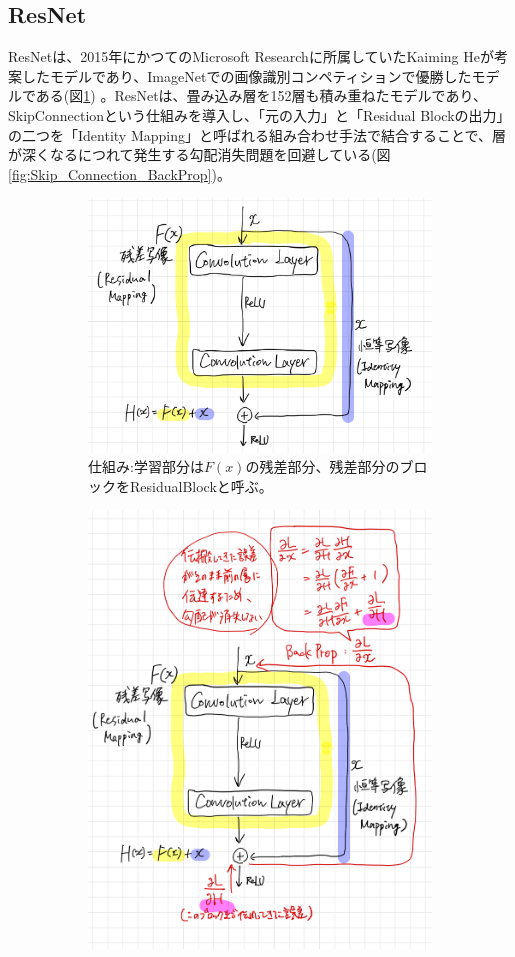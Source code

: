 \documentclass{ltjsarticle}
\begin{document}
\subsection{ResNet}
ResNetは、2015年にかつてのMicrosoft Researchに所属していたKaiming Heが考案したモデルであり、ImageNetでの画像識別コンペティションで優勝したモデルである(図\ref{fig:Skip_Connection}) 。ResNetは、畳み込み層を152層も積み重ねたモデルであり、SkipConnectionという仕組みを導入し、「元の入力」と「Residual Blockの出力」の二つを「Identity Mapping」と呼ばれる組み合わせ手法で結合することで、層が深くなるにつれて発生する勾配消失問題を回避している(図\ref{fig:Skip_Connection_BackProp})。

\begin{figure}[htbp]
  \centering
  \begin{subfigure}[b]{0.45\textwidth}
    \centering
    \includegraphics[width=0.8\linewidth]{./capture/Skip_Connection.png}
    \caption{仕組み:学習部分は$F(x)$の残差部分、残差部分のブロックをResidualBlockと呼ぶ。}
    \label{fig:Skip_Connection}
  \end{subfigure}
  \hfill
  \begin{subfigure}[b]{0.45\textwidth}
    \centering
    \includegraphics[width=0.8\linewidth]{./capture/Skip_Connection_BackProp.png}

\end{subfigure}
\end{figure}
\end{document}
